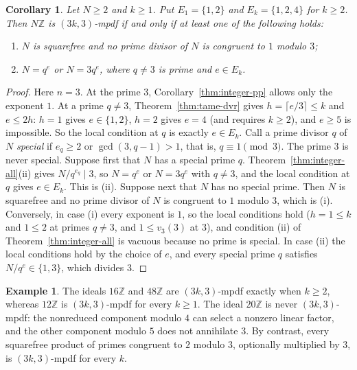 \documentclass[11pt,a4paper]{amsart}
\newtheorem{corollary}[theorem]{Corollary}
\theoremstyle{definition}
\newtheorem{example}[theorem]{Example}
\theoremstyle{remark}
\numberwithin{equation}{section}
\begin{document}
\begin{corollary}\label{cor:integer-cubic}
Let $N\ge2$ and $k\ge1$. Put $E_1=\{1,2\}$ and
$E_k=\{1,2,4\}$ for $k\ge2$. Then $N\mathbb Z$ is $(3k,3)$-mpdf
if and only if at least one of the following holds:
\begin{enumerate}
\item $N$ is squarefree and no prime divisor of $N$ is congruent to
$1$ modulo $3$;
\item $N=q^e$ or $N=3q^e$, where $q\ne3$ is prime and $e\in E_k$.
\end{enumerate}
\end{corollary}
\begin{proof}
Here $n=3$. At the prime $3$, Corollary~\ref{thm:integer-pp} allows only the exponent $1$.
At a prime $q\ne3$, Theorem~\ref{thm:tame-dvr} gives $h=\lceil e/3\rceil\le k$ and $e\le2h$:
$h=1$ gives $e\in\{1,2\}$, $h=2$ gives $e=4$ (and requires $k\ge2$), and $e\ge5$ is impossible.
So the local condition at $q$ is exactly $e\in E_k$.
Call a prime divisor $q$ of $N$ \emph{special} if $e_q\ge2$ or $\gcd(3,q-1)>1$, that is, $q\equiv1\pmod3$.
The prime $3$ is never special.
Suppose first that $N$ has a special prime $q$. Theorem~\ref{thm:integer-all}(ii) gives
$N/q^{e_q}\mid3$, so $N=q^e$ or $N=3q^e$ with $q\ne3$, and the local condition at $q$
gives $e\in E_k$. This is (ii).
Suppose next that $N$ has no special prime. Then $N$ is squarefree and no prime divisor
of $N$ is congruent to $1$ modulo $3$, which is (i).
Conversely, in case (i) every exponent is $1$, so the local conditions hold
($h=1\le k$ and $1\le 2$ at primes $q\ne3$, and $1\le v_3(3)$ at $3$), and
condition (ii) of Theorem~\ref{thm:integer-all} is vacuous because no prime is special.
In case (ii) the local conditions hold by the choice of $e$, and every special prime
$q$ satisfies $N/q^e\in\{1,3\}$, which divides $3$.
\end{proof}

\begin{example}\label{ex:cubic-comparison}
The ideals $16\mathbb Z$ and $48\mathbb Z$ are $(3k,3)$-mpdf exactly
when $k\ge2$, whereas $12\mathbb Z$ is $(3k,3)$-mpdf for every $k\ge1$.
The ideal $20\mathbb Z$ is never $(3k,3)$-mpdf: the nonreduced component
modulo $4$ can select a nonzero linear factor, and the other component
modulo $5$ does not annihilate $3$. By contrast, every squarefree product
of primes congruent to $2$ modulo $3$, optionally multiplied by $3$,
is $(3k,3)$-mpdf for every $k$.
\end{example}
\end{document}
